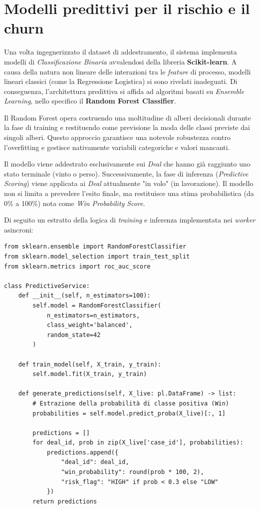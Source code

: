 \documentclass[12pt, a4paper]{report}
\begin{document}
\section{Modelli predittivi per il rischio e il churn}
Una volta ingegnerizzato il dataset di addestramento, il sistema implementa modelli di \textit{Classificazione Binaria} avvalendosi della libreria \textbf{Scikit-learn}. A causa della natura non lineare delle interazioni tra le \textit{feature} di processo, modelli lineari classici (come la Regressione Logistica) si sono rivelati inadeguati. Di conseguenza, l'architettura predittiva si affida ad algoritmi basati su \textit{Ensemble Learning}, nello specifico il \textbf{Random Forest Classifier}.

Il Random Forest opera costruendo una moltitudine di alberi decisionali durante la fase di training e restituendo come previsione la moda delle classi previste dai singoli alberi. Questo approccio garantisce una notevole robustezza contro l'overfitting e gestisce nativamente variabili categoriche e valori mancanti.

Il modello viene addestrato esclusivamente sui \textit{Deal} che hanno già raggiunto uno stato terminale (vinto o perso). Successivamente, la fase di inferenza (\textit{Predictive Scoring}) viene applicata ai \textit{Deal} attualmente "in volo" (in lavorazione). Il modello non si limita a prevedere l'esito finale, ma restituisce una stima probabilistica (da 0\% a 100\%) nota come \textit{Win Probability Score}.

Di seguito un estratto della logica di \textit{training} e inferenza implementata nei \textit{worker} asincroni:

\begin{verbatim}
from sklearn.ensemble import RandomForestClassifier
from sklearn.model_selection import train_test_split
from sklearn.metrics import roc_auc_score

class PredictiveService:
    def __init__(self, n_estimators=100):
        self.model = RandomForestClassifier(
            n_estimators=n_estimators, 
            class_weight='balanced',
            random_state=42
        )

    def train_model(self, X_train, y_train):
        self.model.fit(X_train, y_train)
        
    def generate_predictions(self, X_live: pl.DataFrame) -> list:
        # Estrazione della probabilità di classe positiva (Win)
        probabilities = self.model.predict_proba(X_live)[:, 1]
        
        predictions = []
        for deal_id, prob in zip(X_live['case_id'], probabilities):
            predictions.append({
                "deal_id": deal_id,
                "win_probability": round(prob * 100, 2),
                "risk_flag": "HIGH" if prob < 0.3 else "LOW"
            })
        return predictions
\end{verbatim}
\end{document}
